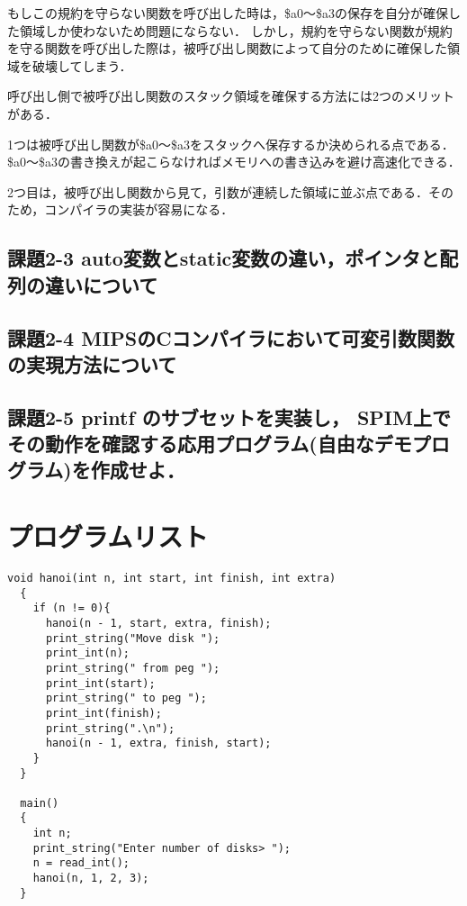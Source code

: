 \documentclass[11pt]{jarticle}
\begin{document}
もしこの規約を守らない関数を呼び出した時は，\$a0～\$a3の保存を自分が確保した領域しか使わないため問題にならない．
しかし，規約を守らない関数が規約を守る関数を呼び出した際は，被呼び出し関数によって自分のために確保した領域を破壊してしまう．

呼び出し側で被呼び出し関数のスタック領域を確保する方法には2つのメリットがある．

1つは被呼び出し関数が\$a0～\$a3をスタックへ保存するか決められる点である．
\$a0～\$a3の書き換えが起こらなければメモリへの書き込みを避け高速化できる．

2つ目は，被呼び出し関数から見て，引数が連続した領域に並ぶ点である．そのため，コンパイラの実装が容易になる．

\subsection{課題2-3 auto変数とstatic変数の違い，ポインタと配列の違いについて}



\subsection{課題2-4 MIPSのCコンパイラにおいて可変引数関数の実現方法について}

\subsection{課題2-5 printf のサブセットを実装し， SPIM上でその動作を確認する応用プログラム(自由なデモプログラム)を作成せよ．}

\section{プログラムリスト} \label{sec:program}

\begin{lstlisting}[caption=hanoi.c,label=hanoi]
  void hanoi(int n, int start, int finish, int extra)
  {
    if (n != 0){
      hanoi(n - 1, start, extra, finish);
      print_string("Move disk ");
      print_int(n);
      print_string(" from peg ");
      print_int(start);
      print_string(" to peg ");
      print_int(finish);
      print_string(".\n");
      hanoi(n - 1, extra, finish, start);
    }
  }
  
  main()
  {
    int n;
    print_string("Enter number of disks> ");
    n = read_int();
    hanoi(n, 1, 2, 3);
  }
\end{lstlisting}
\end{document}
